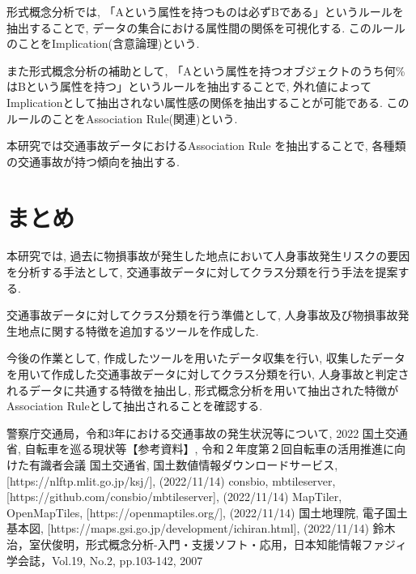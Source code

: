 \documentclass[a4j,8.5pt, twocolumn,fleqn]{jbook}
\begin{document}
形式概念分析では, 「Aという属性を持つものは必ずBである」というルールを抽出することで, データの集合における属性間の関係を可視化する. 
このルールのことをImplication(含意論理)という. 

また形式概念分析の補助として, 「Aという属性を持つオブジェクトのうち何\%はBという属性を持つ」というルールを抽出することで, 外れ値によってImplicationとして抽出されない属性感の関係を抽出することが可能である. 
このルールのことをAssociation Rule(関連)という. 

本研究では交通事故データにおけるAssociation Rule を抽出することで, 各種類の交通事故が持つ傾向を抽出する. 


\section{まとめ}
本研究では, 過去に物損事故が発生した地点において人身事故発生リスクの要因を分析する手法として, 交通事故データに対してクラス分類を行う手法を提案する. 

交通事故データに対してクラス分類を行う準備として, 人身事故及び物損事故発生地点に関する特徴を追加するツールを作成した. 

今後の作業として, 作成したツールを用いたデータ収集を行い, 収集したデータを用いて作成した交通事故データに対してクラス分類を行い, 人身事故と判定されるデータに共通する特徴を抽出し, 形式概念分析を用いて抽出された特徴がAssociation Ruleとして抽出されることを確認する. 

\begin{thebibliography}{9}
    警察庁交通局，令和3年における交通事故の発生状況等について, 2022
    国土交通省, 自転車を巡る現状等【参考資料】, 令和２年度第２回自転車の活用推進に向けた有識者会議
    国土交通省, 国土数値情報ダウンロードサービス, [https://nlftp.mlit.go.jp/ksj/], (2022/11/14)
    consbio, mbtileserver, [https://github.com/consbio/mbtileserver], (2022/11/14)
    MapTiler, OpenMapTiles, [https://openmaptiles.org/], (2022/11/14)
    国土地理院, 電子国土基本図, [https://maps.gsi.go.jp/development/ichiran.html], (2022/11/14)
    鈴木治，室伏俊明，形式概念分析-入門・支援ソフト・応用，日本知能情報ファジィ学会誌，Vol.19, No.2, pp.103-142, 2007
\end{thebibliography}

\appendix
\onecolumn
\end{document}
